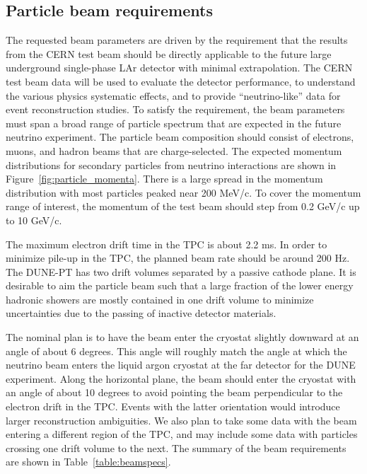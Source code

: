 \label{testbeamreq}
\subsection{Particle beam requirements}
The requested beam parameters are driven by the requirement that the results from the CERN test beam should be directly applicable to the future large underground single-phase LAr detector with minimal extrapolation. The CERN test beam data will be used to evaluate the detector performance, to understand the various physics systematic effects, and to provide ``neutrino-like'' data for event reconstruction studies. To satisfy the requirement, the beam parameters must span a broad range of particle spectrum that are expected in the future neutrino experiment. The particle beam composition should consist of electrons, muons, and hadron beams that are charge-selected. The expected momentum distributions for secondary particles from neutrino interactions are shown in Figure~\ref{fig:particle_momenta}. There is a large spread in the momentum distribution with most particles peaked near 200 MeV/c. To cover the momentum range of interest, the momentum of the test beam should step from 0.2 GeV/c up to 10 GeV/c. 

The maximum electron drift time in the TPC is about 2.2 ms. In order to minimize pile-up in the TPC, the planned beam rate should be around 200 Hz.  The DUNE-PT has two drift volumes separated by a passive cathode plane.
It is desirable to aim the particle beam such that a large fraction of the lower energy hadronic showers are mostly contained in one drift 
volume to minimize uncertainties due to the passing of inactive detector materials.

The nominal plan is to have the beam enter the cryostat slightly downward at an angle of about 6 degrees. This angle will roughly match the angle at which the neutrino beam enters the liquid argon cryostat at the far detector for the DUNE experiment. Along the horizontal plane, the beam should enter the cryostat with an angle of about 10 degrees to avoid pointing the beam perpendicular to the electron drift in the TPC.  
Events with the latter orientation would introduce larger reconstruction ambiguities. 
We also plan to take some data with the beam entering a different region of the TPC, and may include some data with particles crossing one drift volume to the next.  The summary of the beam requirements are shown in Table~\ref{table:beamspecs}.

